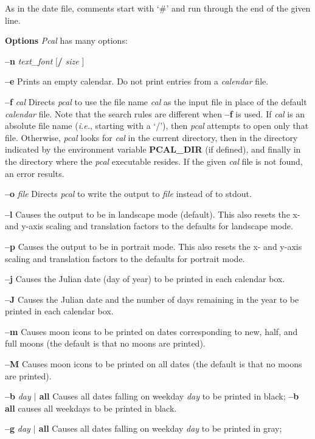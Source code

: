 As in the date file, comments start with `\#' and run through the end of
the given line.

{\bf Options}
{\it Pcal} has many options:
\begin{TPlist}{{\bf --n} {\it text\_font} [{\bf /} {\it size} ]}
\item[{{\bf --e}}]
Prints an empty calendar.  Do not print entries from a {\it calendar}
file.
\item[{{\bf --f} {\it cal}}]
Directs {\it pcal} to use the file name {\it cal} as the input file in
place of the default {\it calendar} file.  Note that the search rules are
different when {\bf --f} is used.  If {\it cal} is an absolute file name
({\it i.e.}, starting with a `/'), then {\it pcal} attempts to open only
that file.  Otherwise, {\it pcal} looks for {\it cal} in the current
directory, then in the directory indicated by the environment variable
{\bf PCAL\_DIR} (if defined), and finally in the directory where the {\it
pcal} executable resides.  If the given {\it cal} file is not found, an
error results.
\item[{{\bf --o} {\it file}}]
Directs {\it pcal} to write the output to {\it file} instead of to
stdout.
\item[{{\bf --l}}]
Causes the output to be in landscape mode (default).  This also resets
the x- and y-axis scaling and translation factors to the defaults for
landscape mode.
\item[{{\bf --p}}]
Causes the output to be in portrait mode.  This also resets the x- and
y-axis scaling and translation factors to the defaults for portrait mode.
\item[{{\bf --j}}]
Causes the Julian date (day of year) to be printed in each calendar box.
\item[{{\bf --J}}]
Causes the Julian date and the number of days remaining in the year to be
printed in each calendar box.
\item[{{\bf --m}}]
Causes moon icons to be printed on dates corresponding to new, half, and
full moons (the default is that no moons are printed).
\item[{{\bf --M}}]
Causes moon icons to be printed on all dates (the default is that no
moons are printed).
\item[{{\bf --b} {\it day} {\bf $|$ all}}]
Causes all dates falling on weekday {\it day} to be printed in black;
{\bf --b all} causes all weekdays to be printed in black.
\item[{{\bf --g} {\it day} {\bf $|$ all}}]
Causes all dates falling on weekday {\it day} to be printed in gray;

\end{TPlist}
